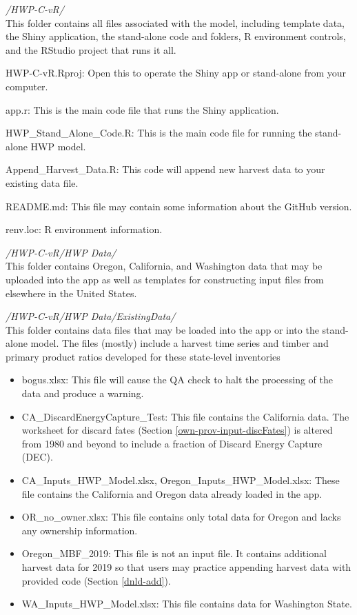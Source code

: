 \documentclass[
  openany]{book}
\begin{document}
\emph{/HWP-C-vR/}\\
This folder contains all files associated with the model, including template data, the Shiny application, the stand-alone code and folders, R environment controls, and the RStudio project that runs it all.

HWP-C-vR.Rproj: Open this to operate the Shiny app or stand-alone from your computer.

app.r: This is the main code file that runs the Shiny application.

HWP\_Stand\_Alone\_Code.R: This is the main code file for running the stand-alone HWP model.

Append\_Harvest\_Data.R: This code will append new harvest data to your existing data file.

README.md: This file may contain some information about the GitHub version.

renv.loc: R environment information.

\emph{/HWP-C-vR/HWP Data/}\\
This folder contains Oregon, California, and Washington data that may be uploaded into the app as well as templates for constructing input files from elsewhere in the United States.

\emph{/HWP-C-vR/HWP Data/ExistingData/}\\
This folder contains data files that may be loaded into the app or into the stand-alone model. The files (mostly) include a harvest time series and timber and primary product ratios developed for these state-level inventories

\begin{itemize}
\item
  bogus.xlsx: This file will cause the QA check to halt the processing of the data and produce a warning.
\item
  CA\_DiscardEnergyCapture\_Test: This file contains the California data. The worksheet for discard fates (Section \ref{own-prov-input-discFates}) is altered from 1980 and beyond to include a fraction of Discard Energy Capture (DEC).
\item
  CA\_Inputs\_HWP\_Model.xlsx, Oregon\_Inputs\_HWP\_Model.xlsx: These file contains the California and Oregon data already loaded in the app.
\item
  OR\_no\_owner.xlsx: This file contains only total data for Oregon and lacks any ownership information.
\item
  Oregon\_MBF\_2019: This file is not an input file. It contains additional harvest data for 2019 so that users may practice appending harvest data with provided code (Section \ref{dnld-add}).
\item
  WA\_Inputs\_HWP\_Model.xlsx: This file contains data for Washington State.
\end{itemize}
\end{document}
